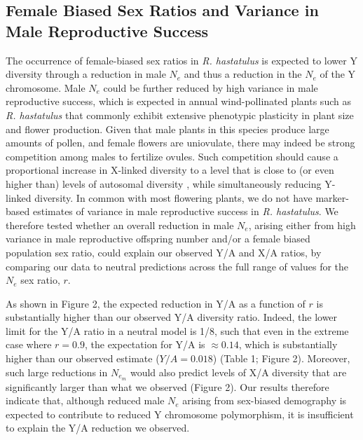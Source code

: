 \documentclass[9pt,twocolumn,twoside,lineno]{gsajnl}
\begin{document}
\subsection*{Female Biased Sex Ratios and Variance in Male Reproductive Success}
The occurrence of female-biased sex ratios in \textit{R. hastatulus} is expected to lower Y diversity through a reduction in male $N_{e}$ and thus a reduction in the $N_{e}$ of the Y chromosome. Male $N_{e}$ could be further reduced by high variance in male reproductive success, which is expected in annual wind-pollinated plants such as \textit{R. hastatulus} that commonly exhibit extensive phenotypic plasticity in plant size and flower production. Given that male plants in this species produce large amounts of pollen, and female flowers are uniovulate, there may indeed be strong competition among males to fertilize ovules. Such competition should cause a proportional increase in X-linked diversity to a level that is close to (or even higher than) levels of autosomal diversity \citep{caballero1995}, while simultaneously reducing Y-linked diversity. In common with most flowering plants, we do not have marker-based estimates of variance in male reproductive success in \textit{R. hastatulus}. We therefore tested whether an overall reduction in male $N_{e}$, arising either from high variance in male reproductive offspring number and/or a female biased population sex ratio, could explain our observed Y/A and X/A ratios, by comparing our data to neutral predictions across the full range of values for the $N_{e}$ sex ratio, $r$.

As shown in Figure 2, the expected reduction in Y/A as a function of $r$ is substantially higher than our observed Y/A diversity ratio. Indeed, the lower limit for the Y/A ratio in a neutral model is 1/8, such that even in the extreme case where $r=0.9$, the expectation for Y/A is $\approx 0.14$, which is substantially higher than our observed estimate ($Y/A= 0.018$) (Table 1; Figure 2). Moreover, such large reductions in $N_{e_{m}}$ would also predict levels of X/A diversity that are significantly larger than what we observed (Figure 2). Our results therefore indicate that, although reduced male $N_{e}$ arising from sex-biased demography is expected to contribute to reduced Y chromosome polymorphism, it is insufficient to explain the Y/A reduction we observed.
\end{document}
